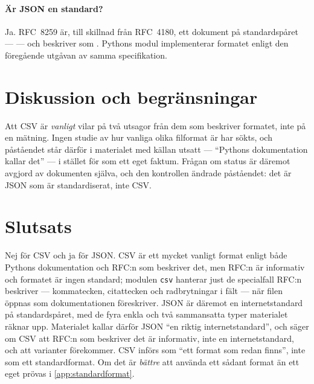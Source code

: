 \paragraph{Är JSON en standard?}  Ja.  RFC~8259 är, till skillnad från
RFC~4180, ett dokument på standardspåret ---  --- och beskriver
 som .  Pythons modul implementerar
formatet enligt den föregående utgåvan av samma
specifikation\autocite{PythonJSON}.

\section{Diskussion och begränsningar}
\label{sec:format-diskussion}

Att CSV är \emph{vanligt} vilar på två utsagor från dem som beskriver
formatet, inte på en mätning.  Ingen studie av hur vanliga olika
filformat är har sökts, och påståendet står därför i materialet med
källan utsatt --- \enquote{Pythons dokumentation kallar det} --- i
stället för som ett eget faktum.  Frågan om status är däremot
avgjord av dokumenten själva, och den kontrollen ändrade påståendet:
det är JSON som är standardiserat, inte CSV.

\section{Slutsats}
\label{sec:format-slutsats}

Nej för CSV och ja för JSON.  CSV är ett mycket vanligt format enligt
både Pythons dokumentation\autocite{PythonCSV} och RFC:n som beskriver
det\autocite{RFC4180}, men RFC:n är informativ och formatet är ingen
standard; modulen \texttt{csv} hanterar just de specialfall
RFC:n beskriver --- kommatecken, citattecken och radbrytningar i fält
--- när filen öppnas som dokumentationen föreskriver.  JSON är däremot
en internetstandard på standardspåret\autocite{RFC8259}, med de fyra
enkla och två sammansatta typer materialet räknar upp.  Materialet
kallar därför JSON \enquote{en riktig internetstandard}, och säger om CSV
att RFC:n som beskriver det är informativ, inte en internetstandard, och
att varianter förekommer.  CSV införs som \enquote{ett format som redan
finns}, inte som ett standardformat.  Om det är \emph{bättre} att
använda ett sådant format än ett eget prövas i \cref{app:standardformat}.


